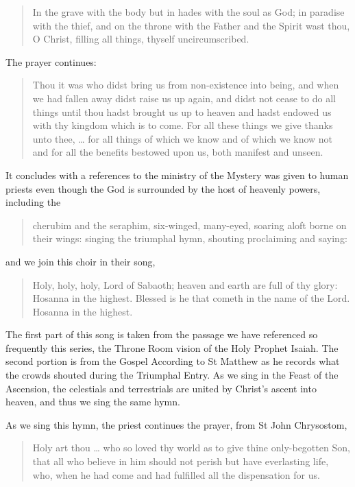 \documentclass[
]{article}
\begin{document}
\begin{quote}
In the grave with the body but in hades with the soul as God; in
paradise with the thief, and on the throne with the Father and the
Spirit wast thou, O Christ, filling all things, thyself uncircumscribed.
\end{quote}

The prayer continues:

\begin{quote}
Thou it was who didst bring us from non-existence into being, and when
we had fallen away didst raise us up again, and didst not cease to do
all things until thou hadst brought us up to heaven and hadst endowed us
with thy kingdom which is to come. For all these things we give thanks
unto thee, \ldots{} for all things of which we know and of which we know
not and for all the benefits bestowed upon us, both manifest and unseen.
\end{quote}

It concludes with a references to the ministry of the Mystery was given
to human priests even though the God is surrounded by the host of
heavenly powers, including the

\begin{quote}
cherubim and the seraphim, six-winged, many-eyed, soaring aloft borne on
their wings: singing the triumphal hymn, shouting proclaiming and
saying:
\end{quote}

and we join this choir in their song,

\begin{quote}
Holy, holy, holy, Lord of Sabaoth; heaven and earth are full of thy
glory: Hosanna in the highest. Blessed is he that cometh in the name of
the Lord. Hosanna in the highest.
\end{quote}

The first part of this song is taken from the passage we have referenced
so frequently this series, the Throne Room vision of the Holy Prophet
Isaiah. The second portion is from the Gospel According to St Matthew as
he records what the crowds shouted during the Triumphal Entry. As we
sing in the Feast of the Ascension, the celestials and terrestrials are
united by Christ's ascent into heaven, and thus we sing the same hymn.

As we sing this hymn, the priest continues the prayer, from St John
Chrysostom,

\begin{quote}
Holy art thou \ldots{} who so loved thy world as to give thine
only-begotten Son, that all who believe in him should not perish but
have everlasting life, who, when he had come and had fulfilled all the
dispensation for us.
\end{quote}
\end{document}
